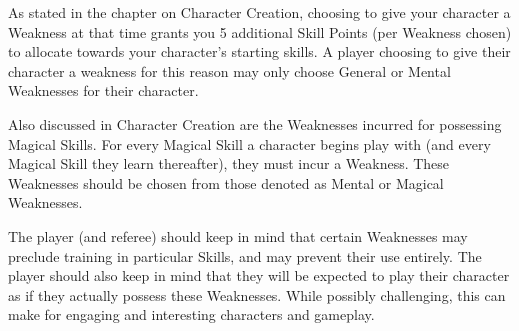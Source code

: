 \documentclass[oneside]{book}
\begin{document}
As stated in the chapter on Character Creation, choosing to give your character a Weakness at that time grants you 5 additional Skill Points (per Weakness chosen) to allocate towards your character's starting skills. A player choosing to give their character a weakness for this reason may only choose General or Mental Weaknesses for their character. 

Also discussed in Character Creation are the Weaknesses incurred for possessing Magical Skills. For every Magical Skill a character begins play with (and every Magical Skill they learn thereafter), they must incur a Weakness. These Weaknesses should be chosen from those denoted as Mental or Magical Weaknesses.

The player (and referee) should keep in mind that certain Weaknesses may preclude training in particular Skills, and may prevent their use entirely. The player should also keep in mind that they will be expected to play their character as if they actually possess these Weaknesses. While possibly challenging, this can make for engaging and interesting characters and gameplay.  
\newpage
\end{document}
